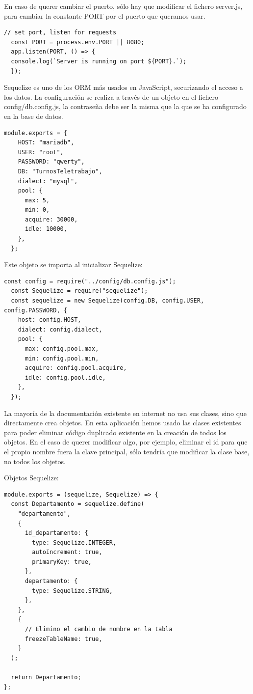 \documentclass[11pt,spanish,listoffigures,listoftables]{tfgetsinf}
\begin{document}
  En caso de querer cambiar el puerto, sólo hay que modificar el fichero server.js, para cambiar la constante PORT por el puerto que queramos usar. 

\begin{lstlisting}[style=ES6, caption={Configuración del puerto de la API }]
  // set port, listen for requests
  const PORT = process.env.PORT || 8080;
  app.listen(PORT, () => {
  console.log(`Server is running on port ${PORT}.`);
  });
\end{lstlisting}

Sequelize es uno de los ORM más usados en JavaScript, securizando el acceso a los datos. La configuración se realiza a través de un objeto en el fichero config/db.config.js, la contraseña debe ser la misma que la que se ha configurado en la base de datos.
\begin{lstlisting}[style=ES6, caption={Configuración de la BBDD para Sequelize}]
  module.exports = {
    HOST: "mariadb",
    USER: "root",
    PASSWORD: "qwerty",
    DB: "TurnosTeletrabajo",
    dialect: "mysql",
    pool: {
      max: 5,
      min: 0,
      acquire: 30000,
      idle: 10000,
    },
  };
\end{lstlisting}
Este objeto se importa al inicializar Sequelize:
\begin{lstlisting}[style=ES6, caption={Importación de la configuración e instanciación de Sequelize}]
  const config = require("../config/db.config.js");
  const Sequelize = require("sequelize");
  const sequelize = new Sequelize(config.DB, config.USER, config.PASSWORD, {
    host: config.HOST,
    dialect: config.dialect,
    pool: {
      max: config.pool.max,
      min: config.pool.min,
      acquire: config.pool.acquire,
      idle: config.pool.idle,
    },
  });
\end{lstlisting}

La mayoría de la documentación existente en internet no usa sus clases, sino que directamente crea objetos. En esta aplicación hemos usado las clases existentes para poder eliminar código duplicado existente en la creación de todos los objetos.
En el caso de querer modificar algo, por ejemplo, eliminar el id para que el propio nombre fuera la clave principal, sólo tendría que modificar la clase base, no todos los objetos.

Objetos Sequelize:

\begin{lstlisting}[style=ES6, caption={Objeto Departamento}]
module.exports = (sequelize, Sequelize) => {
  const Departamento = sequelize.define(
    "departamento",
    {
      id_departamento: {
        type: Sequelize.INTEGER,
        autoIncrement: true,
        primaryKey: true,
      },
      departamento: {
        type: Sequelize.STRING,
      },
    },
    {
      // Elimino el cambio de nombre en la tabla
      freezeTableName: true,
    }
  );

  return Departamento;
};
\end{lstlisting}
\end{document}
